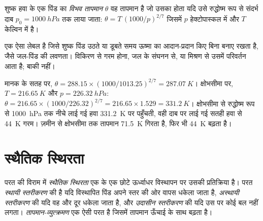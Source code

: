 \begin{definition}[विभव तापमान]\label{def:b1:fluid-envelopes-structure:potential-temperature}
शुष्क हवा के एक पिंड का \emph{विभव तापमान} $\theta$ वह तापमान है जो उसका होता यदि उसे रुद्धोष्म रूप से संदर्भ दाब $p_0 = \qty{1000}{hPa}$ तक लाया जाता: $\theta = T\,(1000/p)^{2/7}$ जिसमें $p$ हेक्टोपास्कल में और $T$ केल्विन में है।
\end{definition}

 एक ऐसा लेबल है जिसे शुष्क पिंड उठते या डूबते समय ऊष्मा का आदान-प्रदान किए बिना बनाए रखता है, जैसे जल-पिंड की लवणता। विकिरण से गरम होना, जल के संघनन से, या मिश्रण से उसमें परिवर्तन आता है; बाकी नहीं।

\begin{example}[मानक वायुमंडल का क्षोभसीमा]\label{ex:b1:fluid-envelopes-structure:tropopause}
मानक के सतह पर, $\theta = 288.15 \times (1000/1013.25)^{2/7} =
\qty{287.07}{K}$। क्षोभसीमा पर, $T = \qty{216.65}{K}$ और $p =
\qty{226.32}{hPa}$: $\theta = 216.65 \times (1000/226.32)^{2/7} = 216.65 \times
1.529 = \qty{331.2}{K}$। क्षोभसीमा से रुद्धोष्म रूप से \qty{1000}{hPa} तक नीचे लाई गई हवा \qty{331.2}{K} पर पहुँचती, वही दाब पर लाई गई सतही हवा से \qty{44}{K} गरम। ज़मीन से क्षोभसीमा तक तापमान \qty{71.5}{K} गिरता है, फिर भी  \qty{44}{K} बढ़ता है।
\end{example}

\section{स्थैतिक स्थिरता}\label{sec:b1:fluid-envelopes-structure:stability}

\begin{definition}[स्थैतिक स्थिरता; तापमान-व्युत्क्रमण]\label{def:b1:fluid-envelopes-structure:stability}
परत की विराम में \emph{स्थैतिक स्थिरता} एक  के एक छोटे ऊर्ध्वाधर विस्थापन पर उसकी प्रतिक्रिया है। परत \emph{स्थायी स्तरीकरण} की है यदि विस्थापित पिंड अपने स्तर की ओर वापस धकेला जाता है, \emph{अस्थायी स्तरीकरण} की यदि वह और दूर धकेला जाता है, और \emph{उदासीन स्तरीकरण} की यदि उस पर कोई बल नहीं लगता। \emph{तापमान-व्युत्क्रमण} एक ऐसी परत है जिसमें तापमान ऊँचाई के साथ बढ़ता है।
\end{definition}


